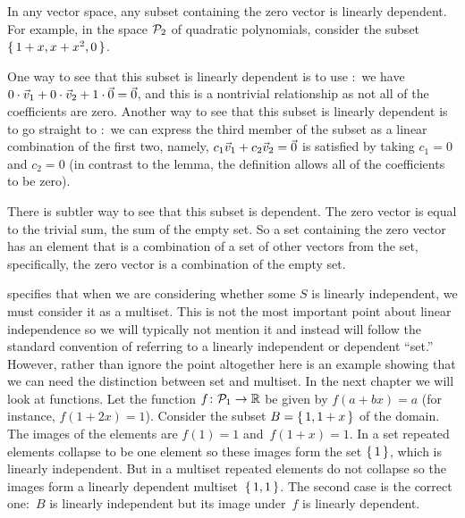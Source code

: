 \begin{example} \label{ex:SetWithZeroVecLD}
In any vector space, any subset containing the zero vector is linearly 
dependent.
For example, in the space $\mathcal{P}_2$ of quadratic polynomials, 
consider the subset $\mbox{$\{\,1+x,x+x^2,0\,\}$}$.

One way to see that this subset is linearly 
dependent is to use :~we have  
$0\cdot\vec{v}_1+0\cdot\vec{v}_2+1\cdot\vec{0}=\vec{0}$, and this is a nontrivial
relationship as not all of the coefficients are zero.
Another way to see that this subset is
linearly dependent is to go straight to :~we
can express the third member of the subset
as a linear combination of the 
first two, namely, $c_1\vec{v}_1+c_2\vec{v}_2=\vec{0}$ is 
satisfied by taking $c_1=0$ and $c_2=0$
(in contrast to the lemma, the definition allows all of the coefficients to 
be zero).

There is subtler way to see that this subset is dependent.
The zero vector is equal to the trivial sum, 
the sum of the empty set.
So a set containing the zero vector has an element that
is a combination of a set of other vectors from the 
set, specifically,
the zero vector is a combination of the empty set.
\end{example}

\begin{remark}\cite{Velleman} \label{rem:WhyLIUsesMultiset}
 specifies that when we 
are considering whether some $S$ is linearly independent, we must
consider it as a multiset.
This is not the most important point about linear independence so 
we will typically not mention it and instead will 
follow the standard convention of referring to a linearly independent or 
dependent ``set.''
However, rather than ignore the point altogether
here is an example showing that we can need the
distinction between set and multiset.
In the next chapter we will look at functions.
Let the function $\mbox{$f\colon \mathcal{P}_1\to \mathbb{R}$}$ be given by
$f(a+bx)=a$ (for instance, $f(1+2x)=1$). 
Consider the subset $B=\mbox{$\{\,1,1+x\,\}$}$ of the domain.
The images of the elements are $f(1)=1$ and~$f(1+x)=1$.
In a set repeated elements collapse to be one element 
so these images form the set $\mbox{$\{\,1\,\}$}$,
which is linearly independent.
But 
in a multiset repeated elements do not collapse so the images form a linearly 
dependent multiset~$\mbox{$\{\,1,1\,\}$}$.
The second case is the correct one:~$B$ is linearly independent but its image 
under~$f$ is linearly dependent.
\end{remark}

